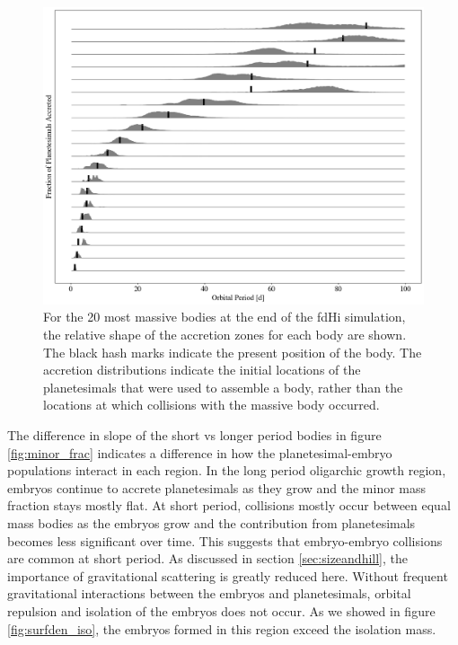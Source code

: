 \documentclass[twocolumn]{aastex63}
\begin{document}
\begin{figure}
\begin{center}
    \includegraphics[width=\textwidth]{figures/acc_zones.png}
    \caption{For the 20 most massive bodies at the end of the fdHi simulation, the relative shape of the accretion zones for each body are shown. The black hash marks indicate the present position of the body. The accretion distributions indicate the initial locations of the planetesimals that were used to assemble a body, rather than the locations at which collisions with the massive body occurred.\label{fig:acc_zones}}
\end{center}
\end{figure}

The difference in slope of the short vs longer period bodies in figure \ref{fig:minor_frac} indicates a difference in how the planetesimal-embryo populations interact in each region. In the long period oligarchic growth region, embryos continue to accrete planetesimals as they grow and the minor mass fraction stays mostly flat. At short period, collisions mostly occur between equal mass bodies as the embryos grow and the contribution from planetesimals becomes less significant over time. This suggests that embryo-embryo collisions are common at short period. As discussed in section \ref{sec:sizeandhill}, the importance of gravitational scattering is greatly reduced here. Without frequent gravitational interactions between the embryos and planetesimals, orbital repulsion \citep{kokubo98} and isolation of the embryos does not occur. As we showed in figure \ref{fig:surfden_iso}, the embryos formed in this region exceed the isolation mass.
\end{document}
